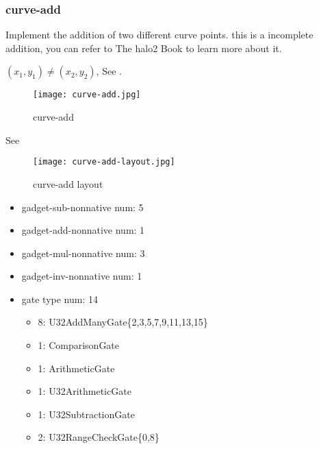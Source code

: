 \subsubsection{curve-add}

Implement the addition of two different curve points. this is a incomplete addition, you can refer to The halo2 Book \cite{website:halo2-book} to learn more about it.

$(x_1,y_1) \ne (x_2,y_2)$, See .
\begin{figure}[!ht]
    \centering
    \texttt{[image: curve-add.jpg]}
    \caption{curve-add}
    \label{fig:curve-add}
\end{figure}

See 
\begin{figure}[!ht]
    \centering
    \texttt{[image: curve-add-layout.jpg]}
    \caption{curve-add layout}
    \label{fig:curve-add-layout}
\end{figure}

\begin{itemize}
    \item gadget-sub-nonnative num: 5
    \item gadget-add-nonnative num: 1
    \item gadget-mul-nonnative num: 3
    \item gadget-inv-nonnative num: 1
    \item gate type num: 14
        \begin{itemize}
            \item 8: U32AddManyGate\{2,3,5,7,9,11,13,15\}
            \item 1: ComparisonGate
            \item 1: ArithmeticGate
            \item 1: U32ArithmeticGate
            \item 1: U32SubtractionGate
            \item 2: U32RangeCheckGate\{0,8\}
        \end{itemize}
\end{itemize}
